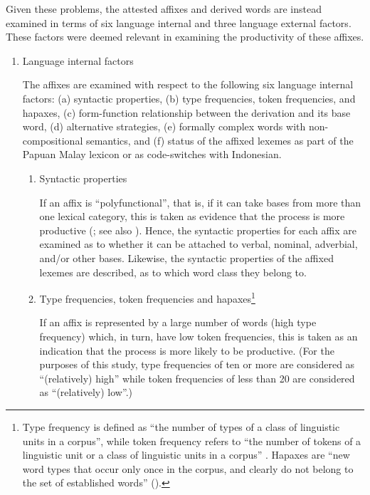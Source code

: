 Given these problems, the attested affixes and derived words are instead examined in terms of six language internal and three language external factors. These factors were deemed relevant in examining the productivity of these affixes.


\begin{enumerate}
\item 
Language internal factors


The affixes are examined with respect to the following six language internal factors: (a) syntactic properties, (b) type frequencies, token frequencies, and hapaxes, (c) form{}-function relationship between the derivation and its base word, (d) alternative strategies, (e) formally complex words with non-compositional semantics, and (f) status of the affixed lexemes as part of the Papuan Malay lexicon or as code-switches with Indonesian.


\begin{enumerate}
\item 
Syntactic properties


If an affix is “polyfunctional”, that is, if it can take bases from more than one lexical category, this is taken as evidence that the process is more productive (\citealt[90--91]{Booij.2002}; see also \citealt{Zwanenburg.2000}). Hence, the syntactic properties for each affix are examined as to whether it can be attached to verbal, nominal, adverbial, and/or other bases. Likewise, the syntactic properties of the affixed lexemes are described, as to which word class they belong to.


\item 
Type frequencies, token frequencies and hapaxes\footnote{Type frequency is defined as “the number of types of a class of linguistic units in a corpus”, while token frequency refers to “the number of tokens of a linguistic unit or a class of linguistic units in a corpus” \citep[323]{Booij.2007}. Hapaxes are “new word types that occur only once in the corpus, and clearly do not belong to the set of established words” (\citeyear*[69]{Booij.2007}).}


If an affix is represented by a large number of words (high type frequency) which, in turn, have low token frequencies, this is taken as an indication that the  process is more likely to be productive. (For the purposes of this study, type frequencies of ten or more are considered as “(relatively) high” while token frequencies of less than 20 are considered as “(relatively) low”.)




\end{enumerate}
\end{enumerate}
